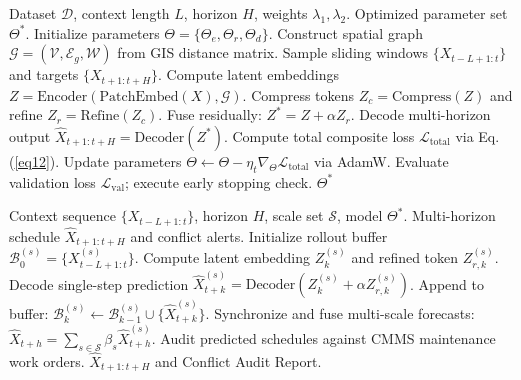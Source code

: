 \documentclass[pdflatex,sn-mathphys,Numbered]{sn-jnl}%
\begin{document}
\begin{algorithm}[h]
\caption{End-to-End Training Procedure for ConstrumindNet}\label{alg1}
\begin{algorithmic}[1]
\Require Dataset $\mathcal{D}$, context length $L$, horizon $H$, weights $\lambda_1, \lambda_2$.
\Ensure Optimized parameter set $\Theta^*$.
\State Initialize parameters $\Theta = \{\Theta_e, \Theta_r, \Theta_d\}$.
\State Construct spatial graph $\mathcal{G} = (\mathcal{V}, \mathcal{E}_g, \mathcal{W})$ from GIS distance matrix.
        \State Sample sliding windows $\{X_{t-L+1:t}\}$ and targets $\{X_{t+1:t+H}\}$.
        \State Compute latent embeddings $Z = \text{Encoder}(\text{PatchEmbed}(X), \mathcal{G})$.
        \State Compress tokens $Z_c = \text{Compress}(Z)$ and refine $Z_r = \text{Refine}(Z_c)$.
        \State Fuse residually: $Z^* = Z + \alpha Z_r$.
        \State Decode multi-horizon output $\widehat{X}_{t+1:t+H} = \text{Decoder}(Z^*)$.
        \State Compute total composite loss $\mathcal{L}_{\text{total}}$ via Eq. (\ref{eq12}).
        \State Update parameters $\Theta \leftarrow \Theta - \eta_t \nabla_\Theta \mathcal{L}_{\text{total}}$ via AdamW.
    \EndFor
    \State Evaluate validation loss $\mathcal{L}_{\text{val}}$; execute early stopping check.
\EndFor
\State \Return $\Theta^*$
\end{algorithmic}
\end{algorithm}

\begin{algorithm}[h]
\caption{Multi-Scale Iterative Forecasting with Latent Refinement}\label{alg2}
\begin{algorithmic}[1]
\Require Context sequence $\{X_{t-L+1:t}\}$, horizon $H$, scale set $\mathcal{S}$, model $\Theta^*$.
\Ensure Multi-horizon schedule $\widehat{X}_{t+1:t+H}$ and conflict alerts.
    \State Initialize rollout buffer $\mathcal{B}_0^{(s)} = \{X_{t-L+1:t}^{(s)}\}$.
        \State Compute latent embedding $Z_k^{(s)}$ and refined token $Z_{r, k}^{(s)}$.
        \State Decode single-step prediction $\widehat{X}_{t+k}^{(s)} = \text{Decoder}(Z_k^{(s)} + \alpha Z_{r, k}^{(s)})$.
        \State Append to buffer: $\mathcal{B}_k^{(s)} \leftarrow \mathcal{B}_{k-1}^{(s)} \cup \{\widehat{X}_{t+k}^{(s)}\}$.
    \EndFor
\EndFor
\State Synchronize and fuse multi-scale forecasts: $\widehat{X}_{t+h} = \sum_{s \in \mathcal{S}} \beta_s \widehat{X}_{t+h}^{(s)}$.
\State Audit predicted schedules against CMMS maintenance work orders.
\State \Return $\widehat{X}_{t+1:t+H}$ and Conflict Audit Report.
\end{algorithmic}
\end{algorithm}
\end{document}
